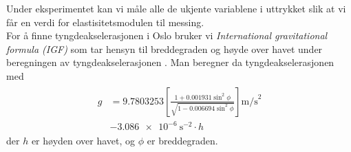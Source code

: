 \documentclass[%
 reprint,
 amsmath,amssymb,
 aps,
 norsk,
 booktabs
]{revtex4-1}
\begin{document}
Under eksperimentet kan vi måle alle de ukjente variablene i uttrykket slik at vi får en verdi for elastisitetsmodulen til messing.\\
For å finne tyngdeakselerasjonen i Oslo bruker vi \textit{International gravitational formula (IGF)} som tar hensyn til breddegraden og høyde over havet under beregningen av tyngdeakselerasjonen \cite{gravity}. Man beregner da tyngdeakselerasjonen med
\begin{align}
\begin{split}
  g &= 9.7803253\left[\frac{1+0.001931\sin^2{\phi}}{\sqrt{1-0.006694\sin^2{\phi}}}\right]\text{m/s}^2\\
      &- \SI{3.086e-6}{\second^{-2}}\cdot h \label{calc_g}
\end{split}
\end{align}
der $h$ er høyden over havet, og $\phi$ er breddegraden.
\end{document}
